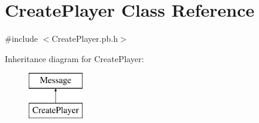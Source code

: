 \hypertarget{class_create_player}{\section{Create\-Player Class Reference}
\label{class_create_player}
}


{\ttfamily \#include $<$Create\-Player.\-pb.\-h$>$}

Inheritance diagram for Create\-Player\-:\begin{figure}[H]
\begin{center}
\leavevmode
\includegraphics[height=2.000000cm]{class_create_player}
\end{center}
\end{figure}
